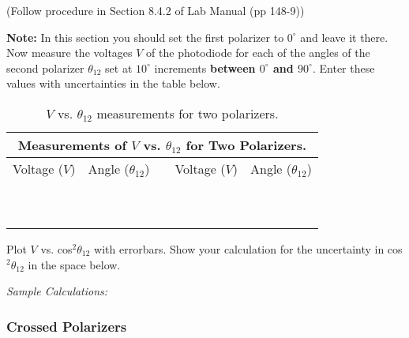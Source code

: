(Follow procedure in Section 8.4.2 of Lab Manual (pp 148-9))
\vspace*{.5cm}

\noindent
{\bf Note:}
In this section you should set the first polarizer to $0^{\circ}$ and leave it there.
\vspace*{.5cm}
\noindent 
Now measure the voltages $V$ of the photodiode for each of the angles of the second 
polarizer $\theta _{12}$ set at $10^{\circ}$ increments 
{\bf between $0^{\circ}$ and $90^{\circ}.$} Enter these values with uncertainties in
the table below. 

\begin{table}[htb]
\begin{center}
\begin{tabular}{|c|c|c|c|c|}
\hline
\multicolumn{5}{|c|}{Measurements of $V$ vs. $\theta _{12}$ for
 Two Polarizers.} \\
\hline
Voltage ($V$) & Angle ($\theta _{12}$) & & Voltage ($V$) & Angle ($\theta _{12}$) \\
\hline
\hspace*{3cm} & \hspace*{3cm} & \hspace*{.3cm} & \hspace*{3cm} & \hspace*{3cm} \\
& & & & \\
\hline
& & & & \\
& & & & \\
\hline
& & & & \\
& & & & \\
\hline
& & & & \\
& & & & \\
\hline
& & & & \\
& & & & \\
\hline
\end{tabular}
\end{center}
\caption{$V$ vs. $\theta _{12}$ measurements for two polarizers.}
\label {tab:PO:2lens}
\end{table}

\noindent
Plot $V$ vs. cos$^2 \theta _{12}$ with errorbars. Show your calculation for the
uncertainty in cos$^2 \theta _{12}$ in the space below.

\noindent
{\it Sample Calculations:}

\newpage

\subsubsection{Crossed Polarizers}

